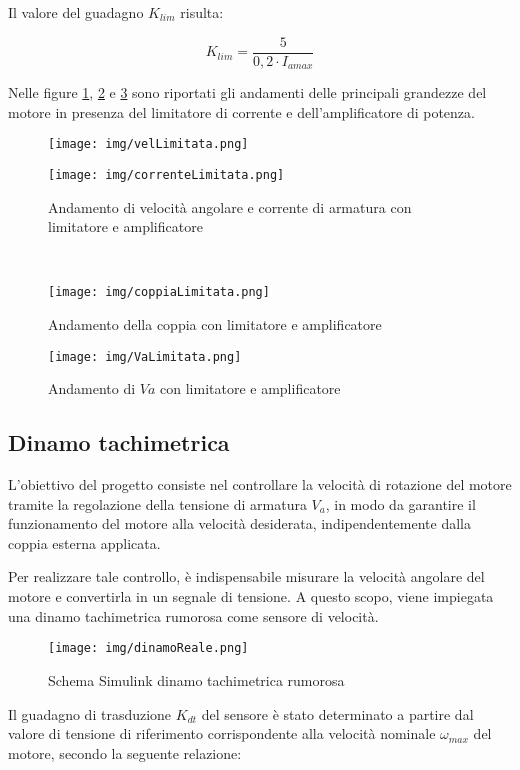 \documentclass{article}
\begin{document}
Il valore del guadagno $K_{lim}$ risulta:

\[
K_{lim} = \frac{5}{0{,}2 \cdot I_{amax}}
\]

Nelle figure \ref{fig:andamenti1}, \ref{fig:andamenti2} e \ref{fig:andamenti3} sono riportati gli andamenti delle principali grandezze del motore in presenza del limitatore di corrente e dell’amplificatore di potenza.

\begin{figure}[h!]
\centering
\texttt{[image: img/velLimitata.png]}
\end{figure}
\begin{figure}[h!]
\centering
\texttt{[image: img/correnteLimitata.png]}
\caption{Andamento di velocità angolare e corrente di armatura con limitatore e amplificatore}
\label{fig:andamenti1}
\end{figure}\

\begin{figure}[h!]
\centering
\texttt{[image: img/coppiaLimitata.png]}
\caption{Andamento della coppia con limitatore e amplificatore}
\label{fig:andamenti2}
\end{figure}

\begin{figure}[h!]
\centering
\texttt{[image: img/VaLimitata.png]}
\caption{Andamento di $Va$ con limitatore e amplificatore}
\label{fig:andamenti3}
\end{figure}
\newpage

\subsection{Dinamo tachimetrica}
L’obiettivo del progetto consiste nel controllare la velocità di rotazione del motore tramite la regolazione della tensione di armatura $V_a$, in modo da garantire il funzionamento del motore alla velocità desiderata, indipendentemente dalla coppia esterna applicata.

Per realizzare tale controllo, è indispensabile misurare la velocità angolare del motore e convertirla in un segnale di tensione. A questo scopo, viene impiegata una dinamo tachimetrica rumorosa come sensore di velocità.

\begin{figure}[h!]
\texttt{[image: img/dinamoReale.png]}
\caption{Schema Simulink dinamo tachimetrica rumorosa}
\label{fig:dinamo}
\end{figure}

\newpage
Il guadagno di trasduzione $K_{dt}$ del sensore è stato determinato a partire dal valore di tensione di riferimento corrispondente alla velocità nominale $\omega_{max}$ del motore, secondo la seguente relazione:
\end{document}
